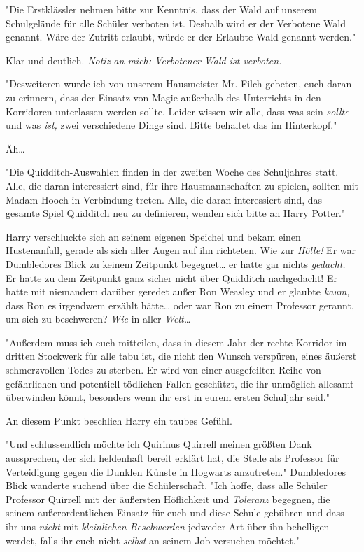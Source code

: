 {"Die Erstklässler nehmen bitte zur Kenntnis, dass der Wald auf unserem Schulgelände für alle Schüler verboten ist. Deshalb wird er der Verbotene Wald genannt. Wäre der Zutritt erlaubt, würde er der Erlaubte Wald genannt werden."

Klar und deutlich. \emph{Notiz an mich: Verbotener Wald ist verboten.}

"Desweiteren wurde ich von unserem Hausmeister Mr. Filch gebeten, euch daran zu erinnern, dass der Einsatz von Magie außerhalb des Unterrichts in den Korridoren unterlassen werden sollte. Leider wissen wir alle, dass was sein \emph{sollte} und was \emph{ist,} zwei verschiedene Dinge sind. Bitte behaltet das im Hinterkopf."

Äh…

"Die Quidditch-Auswahlen finden in der zweiten Woche des Schuljahres statt. Alle, die daran interessiert sind, für ihre Hausmannschaften zu spielen, sollten mit Madam Hooch in Verbindung treten. Alle, die daran interessiert sind, das gesamte Spiel Quidditch neu zu definieren, wenden sich bitte an Harry Potter."

Harry verschluckte sich an seinem eigenen Speichel und bekam einen Hustenanfall, gerade als sich aller Augen auf ihn richteten. Wie zur \emph{Hölle!} Er war Dumbledores Blick zu keinem Zeitpunkt begegnet… er hatte gar nichts \emph{gedacht.} Er hatte zu dem Zeitpunkt ganz sicher nicht über Quidditch nachgedacht! Er hatte mit niemandem darüber geredet außer Ron Weasley und er glaubte \emph{kaum,} dass Ron es irgendwem erzählt hätte… oder war Ron zu einem Professor gerannt, um sich zu beschweren? \emph{Wie} in aller \emph{Welt…}

"Außerdem muss ich euch mitteilen, dass in diesem Jahr der rechte Korridor im dritten Stockwerk für alle tabu ist, die nicht den Wunsch verspüren, eines äußerst schmerzvollen Todes zu sterben. Er wird von einer ausgefeilten Reihe von gefährlichen und potentiell tödlichen Fallen geschützt, die ihr unmöglich allesamt überwinden könnt, besonders wenn ihr erst in eurem ersten Schuljahr seid."

An diesem Punkt beschlich Harry ein taubes Gefühl.

"Und schlussendlich möchte ich Quirinus Quirrell meinen größten Dank aussprechen, der sich heldenhaft bereit erklärt hat, die Stelle als Professor für Verteidigung gegen die Dunklen Künste in Hogwarts anzutreten." Dumbledores Blick wanderte suchend über die Schülerschaft. "Ich hoffe, dass alle Schüler Professor Quirrell mit der äußersten Höflichkeit und \emph{Toleranz} begegnen, die seinem außerordentlichen Einsatz für euch und diese Schule gebühren und dass ihr uns \emph{nicht} mit \emph{kleinlichen Beschwerden} jedweder Art über ihn behelligen werdet, falls ihr euch nicht \emph{selbst} an seinem Job versuchen möchtet."

}
